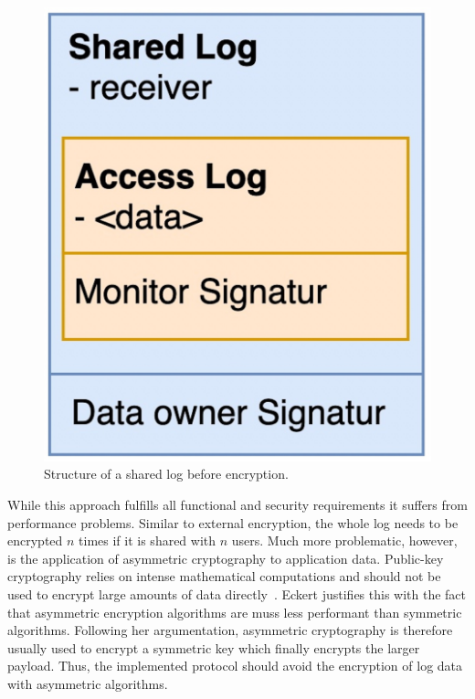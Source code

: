 \documentclass[../main.tex]{subfiles}
\begin{document}
\begin{figure}[ht]
    \includegraphics[scale=0.12]{../img/04/mutual_encryption.jpg}
    \centering
    \caption{Structure of a shared log before encryption.}
    \label{fig:mutual_encryption}
\end{figure}

While this approach fulfills all functional and security requirements it suffers from performance problems.
Similar to external encryption, the whole log needs to be encrypted $n$ times if it is shared with $n$ users.
Much more problematic, however, is the application of asymmetric cryptography to application data.
Public-key cryptography relies on intense mathematical computations and should not be used to encrypt large amounts of data directly~\cite[340]{Eckert2018}.
Eckert justifies this with the fact that asymmetric encryption algorithms are muss less performant than symmetric algorithms.
Following her argumentation, asymmetric cryptography is therefore usually used to encrypt a symmetric key which finally encrypts the larger payload.
Thus, the implemented protocol should avoid the encryption of log data with asymmetric algorithms.
\end{document}
